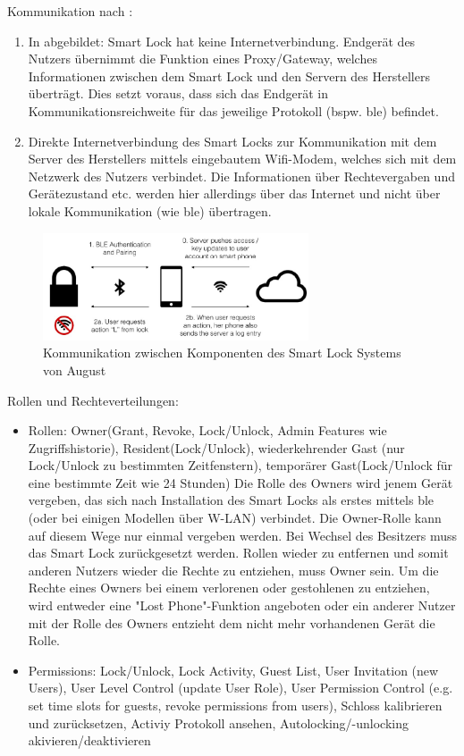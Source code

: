         Kommunikation nach \citeauthor{Ho2016}:
        \begin{enumerate}
            \item In  abgebildet: Smart Lock hat keine Internetverbindung.
                Endgerät des Nutzers übernimmt die Funktion eines Proxy/Gateway, welches Informationen zwischen dem Smart Lock und den Servern des Herstellers überträgt.
                Dies setzt voraus, dass sich das Endgerät in Kommunikationsreichweite für das jeweilige Protokoll (bspw. \gls{ble}) befindet.
            \item Direkte Internetverbindung des Smart Locks zur Kommunikation mit dem Server des Herstellers mittels eingebautem Wifi-Modem, welches sich mit dem Netzwerk des Nutzers verbindet.
                Die Informationen über Rechtevergaben und Gerätezustand etc. werden hier allerdings über das Internet und nicht über lokale Kommunikation (wie \gls{ble}) übertragen.
        \end{enumerate}
        
		\begin{figure}[H]
			\centering
			\includegraphics[width=0.7\textwidth]{paperNotes/ho2016_components}
			\caption{Kommunikation zwischen Komponenten des Smart Lock Systems von August}
			\label{fig:gateway}
		\end{figure}

        Rollen und Rechteverteilungen\cite{Ye2017}\cite{Ho2016}:
		\begin{itemize}
			\item Rollen: Owner(Grant, Revoke, Lock/Unlock, Admin Features wie Zugriffshistorie), Resident(Lock/Unlock), wiederkehrender Gast (nur Lock/Unlock zu bestimmten Zeitfenstern), temporärer Gast(Lock/Unlock für eine bestimmte Zeit wie 24 Stunden)
			    Die Rolle des Owners wird jenem Gerät vergeben, das sich nach Installation des Smart Locks als erstes mittels \gls{ble} (oder bei einigen Modellen über W-LAN) verbindet.
			    Die Owner-Rolle kann auf diesem Wege nur einmal vergeben werden.
			    Bei Wechsel des Besitzers muss das Smart Lock zurückgesetzt werden.
			    Rollen wieder zu entfernen und somit anderen Nutzers wieder die Rechte zu entziehen, muss Owner sein.
			    Um die Rechte eines Owners bei einem verlorenen oder gestohlenen zu entziehen, wird entweder eine "Lost Phone"-Funktion angeboten oder ein anderer Nutzer mit der Rolle des Owners entzieht dem nicht mehr vorhandenen Gerät die Rolle.
			\item Permissions: Lock/Unlock, Lock Activity, Guest List, User Invitation (new Users), User Level Control (update User Role), User Permission Control (e.g. set time slots for guests, revoke permissions from users), Schloss kalibrieren und zurücksetzen\cite{Fuller2017}, Activiy Protokoll ansehen\cite{Fuller2017}, Autolocking/-unlocking akivieren/deaktivieren
		\end{itemize}
